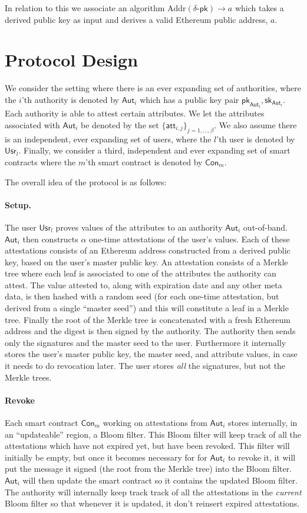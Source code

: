\documentclass[11pt]{article} %
\newcommand{\aut}{\ensuremath{\mathsf{Aut}_i}}
\newcommand{\usr}{\ensuremath{\mathsf{Usr}_l}}
\newcommand{\con}{\ensuremath{\mathsf{Con}_m}}
\newcommand{\pk}{\ensuremath{\mathsf{pk}}}
\newcommand{\sk}{\ensuremath{\mathsf{sk}}}
\newcommand{\Addr}{\ensuremath{\mathrm{Addr}}}
\begin{document}
In relation to this we associate an algorithm $\Addr (\delta\mbox{-}\pk)\to a$ which takes a derived public key as input and derives a valid Ethereum public address, $a$.

\section{Protocol Design}
We consider the setting where there is an ever expanding set of authorities, where the $i$'th authority is denoted by $\mathsf{Aut}_i$ which has a public key pair $\pk_{\aut}, \sk_{\aut}$. Each authority is able to attest certain attributes. We let the attributes associated with $\mathsf{Aut}_i$ be denoted by the set $\{\mathsf{att}_{i,j}\}_{j=1, \dots, \beta}$. We also assume there is an independent, ever expanding set of users, where the $l$'th user is denoted by $\mathsf{Usr}_l$. Finally, we consider a third, independent and ever expanding set of smart contracts where the $m$'th smart contract is denoted by $\mathsf{Con}_m$.

The overall idea of the protocol is as follows:
\paragraph{Setup.} The user $\usr$ proves values of the attributes to an authority $\aut$ out-of-band. $\aut$ then constructs $\alpha$ one-time attestations of the user's values. Each of these attestations consists of an Ethereum address constructed from a derived public key, based on the user's master public key. An attestation consists of a Merkle tree where each leaf is associated to one of the attributes the authority can attest. The value attested to, along with expiration date and any other meta data, is then hashed with a random seed (for each one-time attestation, but derived from a single ``master seed'') and this will constitute a leaf in a Merkle tree. Finally the root of the Merkle tree is concatenated with a fresh Ethereum address and the digest is then signed by the authority. The authority then sends only the signatures and the master seed to the user. Furthermore it internally stores the user's master public key, the master seed, and attribute values, in case it needs to do revocation later. The user stores \emph{all} the signatures, but not the Merkle trees.

\paragraph{Revoke}
Each smart contract $\con$ working on attestations from $\aut$ stores internally, in an ``updateable'' region, a Bloom filter. This Bloom filter will keep track of all the attestations which have not expired yet, but have been revoked. This filter will initially be empty, but once it becomes necessary for for $\aut$ to revoke it, it will put the message it signed (the root from the Merkle tree) into the Bloom filter. $\aut$ will then update the smart contract so it contains the updated Bloom filter. The authority will internally keep track track of all the attestations in the \emph{current} Bloom filter so that whenever it is updated, it don't reinsert expired attestations.
\end{document}
